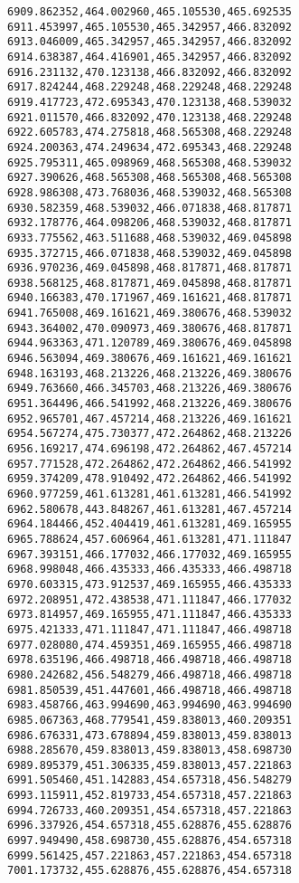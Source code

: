 \documentclass[11pt]{article}
\begin{document}
\begin{Verbatim}[commandchars=\\\{\}]
6909.862352,464.002960,465.105530,465.692535
6911.453997,465.105530,465.342957,466.832092
6913.046009,465.342957,465.342957,466.832092
6914.638387,464.416901,465.342957,466.832092
6916.231132,470.123138,466.832092,466.832092
6917.824244,468.229248,468.229248,468.229248
6919.417723,472.695343,470.123138,468.539032
6921.011570,466.832092,470.123138,468.229248
6922.605783,474.275818,468.565308,468.229248
6924.200363,474.249634,472.695343,468.229248
6925.795311,465.098969,468.565308,468.539032
6927.390626,468.565308,468.565308,468.565308
6928.986308,473.768036,468.539032,468.565308
6930.582359,468.539032,466.071838,468.817871
6932.178776,464.098206,468.539032,468.817871
6933.775562,463.511688,468.539032,469.045898
6935.372715,466.071838,468.539032,469.045898
6936.970236,469.045898,468.817871,468.817871
6938.568125,468.817871,469.045898,468.817871
6940.166383,470.171967,469.161621,468.817871
6941.765008,469.161621,469.380676,468.539032
6943.364002,470.090973,469.380676,468.817871
6944.963363,471.120789,469.380676,469.045898
6946.563094,469.380676,469.161621,469.161621
6948.163193,468.213226,468.213226,469.380676
6949.763660,466.345703,468.213226,469.380676
6951.364496,466.541992,468.213226,469.380676
6952.965701,467.457214,468.213226,469.161621
6954.567274,475.730377,472.264862,468.213226
6956.169217,474.696198,472.264862,467.457214
6957.771528,472.264862,472.264862,466.541992
6959.374209,478.910492,472.264862,466.541992
6960.977259,461.613281,461.613281,466.541992
6962.580678,443.848267,461.613281,467.457214
6964.184466,452.404419,461.613281,469.165955
6965.788624,457.606964,461.613281,471.111847
6967.393151,466.177032,466.177032,469.165955
6968.998048,466.435333,466.435333,466.498718
6970.603315,473.912537,469.165955,466.435333
6972.208951,472.438538,471.111847,466.177032
6973.814957,469.165955,471.111847,466.435333
6975.421333,471.111847,471.111847,466.498718
6977.028080,474.459351,469.165955,466.498718
6978.635196,466.498718,466.498718,466.498718
6980.242682,456.548279,466.498718,466.498718
6981.850539,451.447601,466.498718,466.498718
6983.458766,463.994690,463.994690,463.994690
6985.067363,468.779541,459.838013,460.209351
6986.676331,473.678894,459.838013,459.838013
6988.285670,459.838013,459.838013,458.698730
6989.895379,451.306335,459.838013,457.221863
6991.505460,451.142883,454.657318,456.548279
6993.115911,452.819733,454.657318,457.221863
6994.726733,460.209351,454.657318,457.221863
6996.337926,454.657318,455.628876,455.628876
6997.949490,458.698730,455.628876,454.657318
6999.561425,457.221863,457.221863,454.657318
7001.173732,455.628876,455.628876,454.657318

\end{Verbatim}
\end{document}
